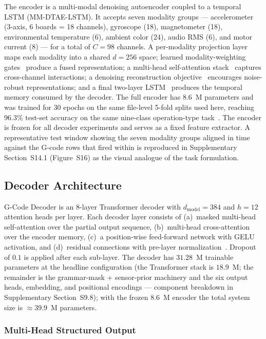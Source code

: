 \documentclass[sensors,article,submit,moreauthors,pdftex]{Definitions/mdpi}
\newcommand{\modelname}{G-Code Decoder}
\newcommand{\encname}{MM-DTAE-LSTM}
\begin{document}
The encoder is a multi-modal denoising autoencoder coupled to a temporal LSTM (\encname{}). It accepts seven modality groups --- accelerometer (3-axis, 6 boards = 18 channels), gyroscope (18), magnetometer (18), environmental temperature (6), ambient color (24), audio RMS (6), and motor current (8) --- for a total of $C=98$ channels. A per-modality projection layer maps each modality into a shared $d=256$ space; learned modality-weighting gates~\cite{lahat2015multimodal,ramachandram2017deep} produce a fused representation; a multi-head self-attention stack~\cite{vaswani2017attention} captures cross-channel interactions; a denoising reconstruction objective~\cite{vincent2010stacked} encourages noise-robust representations; and a final two-layer LSTM~\cite{hochreiter1997long,malhotra2015lstm} produces the temporal memory consumed by the decoder. The full encoder has 8.6~M parameters and was trained for 30 epochs on the same file-level 5-fold splits used here, reaching 96.3\% test-set accuracy on the same nine-class operation-type task~\cite{encoder_paper}. The encoder is frozen for all decoder experiments and serves as a fixed feature extractor. A representative test window showing the seven modality groups aligned in time against the G-code rows that fired within is reproduced in Supplementary Section~S14.1 (Figure~S16) as the visual analogue of the task formulation.

\subsection{Decoder Architecture}
\label{sec:decoder}

\modelname{} is an 8-layer Transformer decoder with $d_{\text{model}}=384$ and $h=12$ attention heads per layer. Each decoder layer consists of (a)~masked multi-head self-attention over the partial output sequence, (b)~multi-head cross-attention over the encoder memory, (c)~a position-wise feed-forward network with GELU activation, and (d)~residual connections with pre-layer normalization~\cite{ba2016layernorm}. Dropout~\cite{srivastava2014dropout} of $0.1$ is applied after each sub-layer. The decoder has $31.28$~M trainable parameters at the headline configuration (the Transformer stack is $18.9$~M; the remainder is the grammar-mask + sensor-prior machinery and the six output heads, embedding, and positional encodings --- component breakdown in Supplementary Section~S9.8); with the frozen $8.6$~M encoder the total system size is $\approx\!39.9$~M parameters.

\subsubsection{Multi-Head Structured Output}
\label{sec:multihead}
\end{document}
